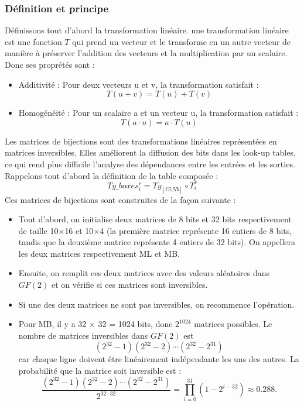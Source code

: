 \documentclass[a4paper, 10pt]{article}
\begin{document}
\subsubsection{Définition et principe}
Définissons tout d'abord la transformation linéaire. une transformation linéaire est une fonction $T$ qui prend un vecteur 
et le transforme en un autre vecteur de manière à préserver l'addition des vecteurs et la multiplication par un scalaire.
Donc ses proprétés sont :
\begin{itemize}
  \item Additivité : Pour deux vecteurs u et v, la transformation satisfait : 
  \[ T(u + v) = T(u) + T(v) \]
  \item Homogénéité : Pour un scalaire a et un vecteur u, la transformation satisfait :
  \[ T(a \cdot u) = a \cdot T(u) \]
\end{itemize}
Les matrices de bijections sont des transformations linéaires représentées en matrices inversibles. 
Elles améliorent la diffusion des bits dans les look-up tables, ce qui rend plus difficile l'analyse 
des dépendances entre les entrées et les sorties.
Rappelons tout d'abord la définition de la table composée :
\[ Ty\_boxes_{i}^{r} = Ty_{[i \% Nb]} \circ T_{i}^{r} \]
Ces matrices de bijections sont construites de la façon suivante :
\begin{itemize}
  \item Tout d'abord, on initialise deux matrices de 8 bits et 32 bits 
  respectivement de taille 10$\times$16 et 10$\times$4 (la première matrice représente 16 entiers de 8 bits, tandis que la deuxième 
  matrice représente 4 entiers de 32 bits). 
  On appellera les deux matrices respectivement ML et MB.
  \item Ensuite, on remplit ces deux matrices avec des valeurs aléatoires dans \(GF(2)\) et on vérifie si ces matrices sont inversibles.
  \item Si une des deux matrices ne sont pas inversibles, on recommence l'opération.
  \item Pour MB, il y a 32 $\times$ 32 = 1024 bits, donc $2^{1024}$ matrices possibles. Le nombre de matrices inversibles dans $GF(2)$ 
  est \[(2^{32} - 1)(2^{32} - 2) \cdots (2^{32} - 2^{31})\] car chaque ligne doivent être linéairement indépendante les uns des autres. 
  La probabilité que la matrice soit inversible est : 
  \[ \frac{(2^{32} - 1)(2^{32} - 2) \cdots (2^{32} - 2^{31})}{2^{32 \cdot 32}} = \prod_{i=0}^{31} \left(1 - 2^{i - 32}\right) \approx 0.288. \]
\end{itemize}
\end{document}
